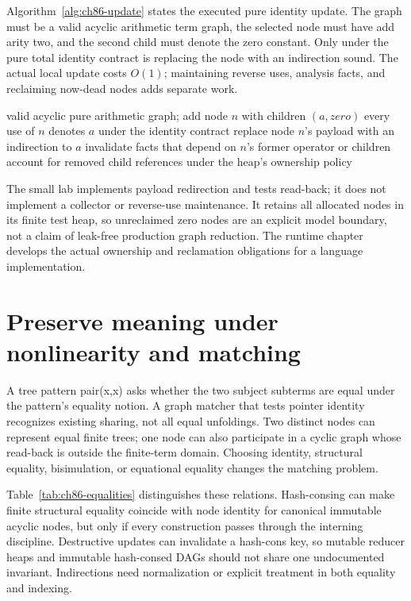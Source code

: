 Algorithm~\ref{alg:ch86-update} states the executed pure identity update.
The graph must be a valid acyclic arithmetic term graph, the selected node must have add arity two, and the second child must denote the zero constant.
Only under the pure total identity contract is replacing the node with an indirection sound.
The actual local update costs $O(1)$; maintaining reverse uses, analysis facts, and reclaiming now-dead nodes adds separate work.

\begin{algorithm}[htbp]
\caption{Redirect a shared pure add-zero node while preserving all incoming edges.}
\label{alg:ch86-update}
\begin{pseudocode}
\Require valid acyclic pure arithmetic graph; add node $n$ with children $(a,zero)$
\Ensure every use of $n$ denotes $a$ under the identity contract
\State replace node $n$'s payload with an indirection to $a$
\State invalidate facts that depend on $n$'s former operator or children
\State account for removed child references under the heap's ownership policy
\end{pseudocode}
\end{algorithm}

The small lab implements payload redirection and tests read-back; it does not implement a collector or reverse-use maintenance.
It retains all allocated nodes in its finite test heap, so unreclaimed zero nodes are an explicit model boundary, not a claim of leak-free production graph reduction.
The runtime chapter develops the actual ownership and reclamation obligations for a language implementation.

\section{Preserve meaning under nonlinearity and matching}
\label{sec:ch86-nonlinear}
A tree pattern pair(x,x) asks whether the two subject subterms are equal under the pattern's equality notion.
A graph matcher that tests pointer identity recognizes existing sharing, not all equal unfoldings.
Two distinct nodes can represent equal finite trees; one node can also participate in a cyclic graph whose read-back is outside the finite-term domain.
Choosing identity, structural equality, bisimulation, or equational equality changes the matching problem.

Table~\ref{tab:ch86-equalities} distinguishes these relations.
Hash-consing can make finite structural equality coincide with node identity for canonical immutable acyclic nodes, but only if every construction passes through the interning discipline.
Destructive updates can invalidate a hash-cons key, so mutable reducer heaps and immutable hash-consed DAGs should not share one undocumented invariant.
Indirections need normalization or explicit treatment in both equality and indexing.

